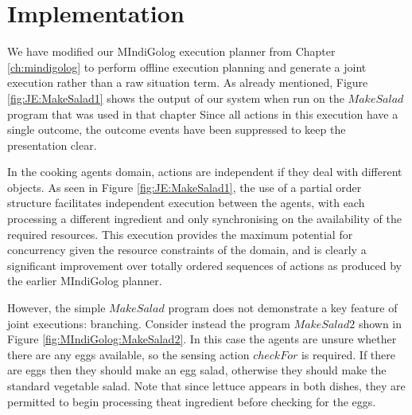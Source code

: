 \section{Implementation\label{sec:JointExec:Implementation}}

We have modified our MIndiGolog execution planner from Chapter \ref{ch:mindigolog}
to perform offline execution planning and generate a joint execution
rather than a raw situation term. As already mentioned, Figure \ref{fig:JE:MakeSalad1}
shows the output of our system when run on the $MakeSalad$ program
that was used in that chapter Since all actions in this execution
have a single outcome, the outcome events have been suppressed to
keep the presentation clear.

In the cooking agents domain, actions are independent if they deal
with different objects. As seen in Figure \ref{fig:JE:MakeSalad1},
the use of a partial order structure facilitates independent execution
between the agents, with each processing a different ingredient and
only synchronising on the availability of the required resources.
This execution provides the maximum potential for concurrency given
the resource constraints of the domain, and is clearly a significant
improvement over totally ordered sequences of actions as produced
by the earlier MIndiGolog planner.

However, the simple $MakeSalad$ program does not demonstrate a key
feature of joint executions: branching. Consider instead the program
$MakeSalad2$ shown in Figure \ref{fig:MIndiGolog:MakeSalad2}. In
this case the agents are unsure whether there are any eggs available,
so the sensing action $checkFor$ is required. If there are eggs then
they should make an egg salad, otherwise they should make the standard
vegetable salad. Note that since lettuce appears in both dishes, they
are permitted to begin processing theat ingredient before checking
for the eggs.

